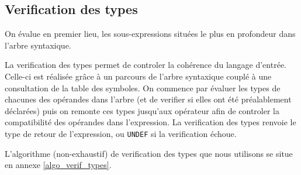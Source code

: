 \newpage
\subsection{Verification des types}

On évalue en premier lieu, les sous-expressions situées le plus en profondeur dans l'arbre syntaxique.

La verification des types permet de controler la cohérence du langage d'entrée. Celle-ci est réalisée grâce à un parcours de l'arbre syntaxique couplé à une consultation de la table des symboles.
On commence par évaluer les types de chacunes des opérandes dans l'arbre (et de verifier si elles ont été préalablement déclarées) puis on remonte ces types jusqu'aux opérateur afin de controler la compatibilité des opérandes dans l'expression. La verification des types renvoie le type de retour de l'expression, ou \verb?UNDEF? si la verification échoue.\\

\begin{center}
\end{center}

L'algorithme (non-exhaustif) de verification des types que nous utilisons se situe en annexe \ref{algo_verif_types}.
~~\\
